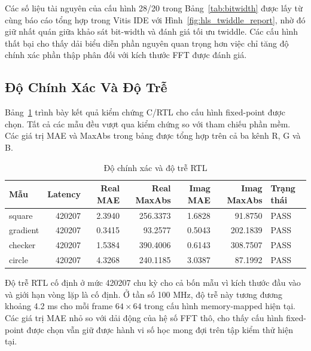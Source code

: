 ﻿\documentclass[conference]{IEEEtran}
\begin{document}
Các số liệu tài nguyên của cấu hình 28/20 trong Bảng~\ref{tab:bitwidth} được lấy từ cùng báo cáo tổng hợp trong Vitis IDE với Hình~\ref{fig:hls_twiddle_report}, nhờ đó giữ nhất quán giữa khảo sát bit-width và đánh giá tối ưu twiddle. Các cấu hình thất bại cho thấy dải biểu diễn phần nguyên quan trọng hơn việc chỉ tăng độ chính xác phần thập phân đối với kích thước FFT được đánh giá.

\subsection{Độ Chính Xác Và Độ Trễ}
Bảng~\ref{tab:accuracy_latency} trình bày kết quả kiểm chứng C/RTL cho cấu hình fixed-point được chọn. Tất cả các mẫu đều vượt qua kiểm chứng so với tham chiếu phần mềm. Các giá trị MAE và MaxAbs trong bảng được tổng hợp trên cả ba kênh R, G và B.

\begin{table}[t]
    \caption{Độ chính xác và độ trễ RTL}
    \centering
    \label{tab:accuracy_latency}
    \begin{tabular}{lrrrrrl}
        \toprule
        \textbf{Mẫu} & \textbf{Latency} & \textbf{Real MAE} & \textbf{Real MaxAbs} & \textbf{Imag MAE} & \textbf{Imag MaxAbs} & \textbf{Trạng thái} \\
        \midrule
        square       & 420207           & 2.3940            & 256.3373             & 1.6828            & 91.8750              & PASS                \\
        gradient     & 420207           & 0.3415            & 93.2577              & 0.5043            & 202.1839             & PASS                \\
        checker      & 420207           & 1.5384            & 390.4006             & 0.6143            & 308.7507             & PASS                \\
        circle       & 420207           & 4.3268            & 240.1185             & 3.0387            & 87.1992              & PASS                \\
        \bottomrule
    \end{tabular}
\end{table}

Độ trễ RTL cố định ở mức 420207 chu kỳ cho cả bốn mẫu vì kích thước đầu vào và giới hạn vòng lặp là cố định. Ở tần số 100 MHz, độ trễ này tương đương khoảng 4.2 ms cho mỗi frame $64\times64$ trong cấu hình memory-mapped hiện tại. Các giá trị MAE nhỏ so với dải động của hệ số FFT thô, cho thấy cấu hình fixed-point được chọn vẫn giữ được hành vi số học mong đợi trên tập kiểm thử hiện tại.
\end{document}

